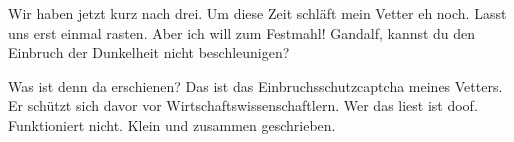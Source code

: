 \begin{verseplay}[10em]
\s{\Gimli} Wir haben jetzt kurz nach drei. Um diese Zeit schläft mein Vetter eh noch. Lasst uns erst einmal rasten.
\s{\Sum} Aber ich will zum Festmahl!
\s{\Legolars} Gandalf, kannst du den Einbruch der Dunkelheit nicht beschleunigen?
\end{verseplay}

\begin{verseplay}[10em]
\s{\Frodo} Was ist denn da erschienen?
\s{\Gimli} Das ist das Einbruchsschutzcaptcha meines Vetters. Er schützt sich davor vor Wirtschaftswissenschaftlern.
\s{\Gandalf}  Wer das liest ist doof.
\s{\Legolars}  Funktioniert nicht.
\s{\Gandalf} Klein und zusammen geschrieben.

\end{verseplay}


